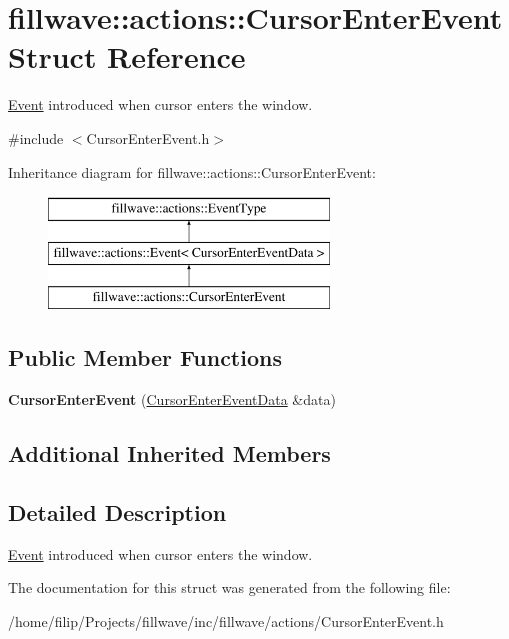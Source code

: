 \hypertarget{classfillwave_1_1actions_1_1CursorEnterEvent}{}\section{fillwave\+:\+:actions\+:\+:Cursor\+Enter\+Event Struct Reference}
\label{classfillwave_1_1actions_1_1CursorEnterEvent}


\hyperlink{classfillwave_1_1actions_1_1Event}{Event} introduced when cursor enters the window.  




{\ttfamily \#include $<$Cursor\+Enter\+Event.\+h$>$}

Inheritance diagram for fillwave\+:\+:actions\+:\+:Cursor\+Enter\+Event\+:\begin{figure}[H]
\begin{center}
\leavevmode
\includegraphics[height=3.000000cm]{classfillwave_1_1actions_1_1CursorEnterEvent}
\end{center}
\end{figure}
\subsection*{Public Member Functions}
\begin{DoxyCompactItemize}
\item 
\hypertarget{classfillwave_1_1actions_1_1CursorEnterEvent_a695cbbb66348b813642b3ba27283ae59}{}{\bfseries Cursor\+Enter\+Event} (\hyperlink{structfillwave_1_1actions_1_1CursorEnterEventData}{Cursor\+Enter\+Event\+Data} \&data)\label{classfillwave_1_1actions_1_1CursorEnterEvent_a695cbbb66348b813642b3ba27283ae59}

\end{DoxyCompactItemize}
\subsection*{Additional Inherited Members}


\subsection{Detailed Description}
\hyperlink{classfillwave_1_1actions_1_1Event}{Event} introduced when cursor enters the window. 

The documentation for this struct was generated from the following file\+:\begin{DoxyCompactItemize}
\item 
/home/filip/\+Projects/fillwave/inc/fillwave/actions/Cursor\+Enter\+Event.\+h\end{DoxyCompactItemize}

